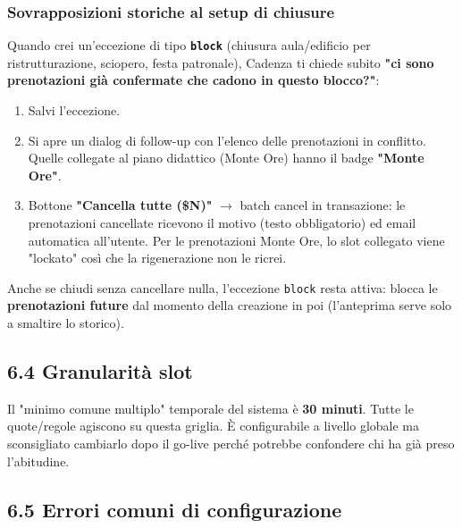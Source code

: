 \documentclass[11pt,a4paper]{article}
\begin{document}
\subsubsection{Sovrapposizioni storiche al setup di chiusure}


Quando crei un'eccezione di tipo \textbf{\texttt{block}} (chiusura aula/edificio per ristrutturazione, sciopero, festa patronale), Cadenza ti chiede subito \textbf{"ci sono prenotazioni già confermate che cadono in questo blocco?"}:

\begin{enumerate}
  \item Salvi l'eccezione.
  \item Si apre un dialog di follow-up con l'elenco delle prenotazioni in conflitto. Quelle collegate al piano didattico (Monte Ore) hanno il badge \textbf{"Monte Ore"}.
  \item Bottone \textbf{"Cancella tutte (\$N)"} $\rightarrow$ batch cancel in transazione: le prenotazioni cancellate ricevono il motivo (testo obbligatorio) ed email automatica all'utente. Per le prenotazioni Monte Ore, lo slot collegato viene "lockato" così che la rigenerazione non le ricrei.
\end{enumerate}

Anche se chiudi senza cancellare nulla, l'eccezione \texttt{block} resta attiva: blocca le \textbf{prenotazioni future} dal momento della creazione in poi (l'anteprima serve solo a smaltire lo storico).

\subsection{6.4 Granularità slot}


Il "minimo comune multiplo" temporale del sistema è \textbf{30 minuti}. Tutte le quote/regole agiscono su questa griglia. È configurabile a livello globale ma sconsigliato cambiarlo dopo il go-live perché potrebbe confondere chi ha già preso l'abitudine.

\subsection{6.5 Errori comuni di configurazione}
\end{document}
